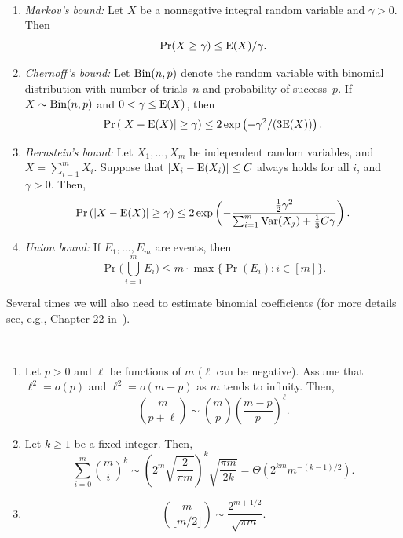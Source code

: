 \documentclass[12pt,reqno]{amsart}
\begin{document}
\begin{ineq}\ \\[-15pt]
\begin{enumerate}[label=(\roman*)]
\item \emph{Markov's bound:} Let $X$ be a nonnegative integral random variable and $\gamma>0$. Then
\[
\Pr(X \ge \gamma) \le \mathrm{E}(X) / \gamma.
\]
\item \emph{Chernoff's bound:} Let $\textrm{Bin}(n,p)$ denote the random variable with binomial distribution with number of trials~$n$ and probability of success~$p$. If $X \sim \textrm{Bin}(n,p)$ and $0 < \gamma \leq \mathrm{E}(X)$, then
\[
\Pr \left( |X - \mathrm{E}(X)| \geq \gamma \right) \leq 2 \exp \left( -\gamma^2/(3\mathrm{E}(X)) \right) .
\]
\item \emph{Bernstein's bound:} Let $X_1, \ldots, X_m$ be independent random variables, and $X = \sum_{i=1}^m X_i$. Suppose that $|X_i - \mathrm{E}(X_i)| \le C$ always holds for all $i$, and $\gamma>0$. Then,
\[
\Pr \left( |X - \mathrm{E}(X)| \geq \gamma \right) \leq 2\exp \left ( -\frac{\frac{1}{2} \gamma^2}{\sum_{i=1}^m \mathrm{Var}(X_j)+\tfrac{1}{3} C\gamma} \right ).
\]
\item \emph{Union bound:} If $E_1,\dots,E_m$ are events, then 
\[
\Pr \Big( \bigcup_{i=1}^m E_i \Big) \leq m \cdot \max \{\Pr(E_i): i \in [m]\}.
\]
\end{enumerate}
\end{ineq}

Several times we will also need to estimate binomial coefficients (for more details see, e.g., Chapter 22 in~\cite{Handbook}).

\newpage

\begin{bc}\ \\[-15pt]
\begin{enumerate}[label=(A\arabic*)]
\item\label{approx:2} Let $p>0$ and $\ell$ be functions of $m$ ($\ell$ can be negative). Assume that $\ell^2 = o(p)$ and $\ell^2 = o(m-p)$ as $m$ tends to infinity. Then,
\[
\binom{m}{p+\ell}\sim \binom{m}{p} \left(\frac{m-p}{p}\right)^\ell.
\]

\item\label{approx:1} Let $k\ge 1$ be a fixed integer. Then, 
\[
\sum_{i=0}^m \binom{m}{i}^k \sim \left( 2^m \sqrt{\frac{2}{\pi m}} \right)^k \sqrt{\frac{\pi m}{2k}}
= \Theta(2^{km} m^{-(k-1)/2}). 
\]

\item\label{approx:3} 
\[
\binom{m}{\lfloor m/2 \rfloor} \sim \frac{2^{m+1/2}}{\sqrt{\pi m}}.
\]
\end{enumerate}
\end{bc}
\end{document}
